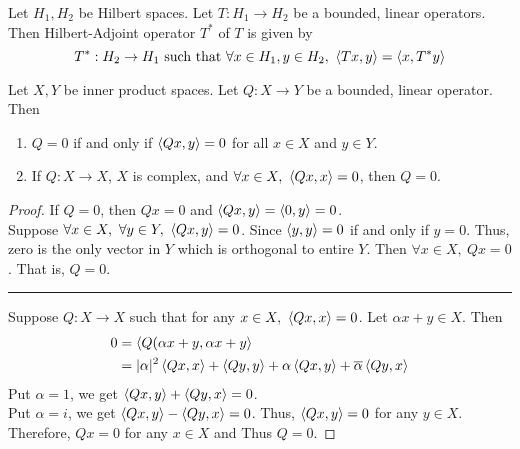 \begin{definition}
	Let $H_1,H_2$ be Hilbert spaces.
	Let $T : H_1 \to H_2$ be a bounded, linear operators.
	Then Hilbert-Adjoint operator $T^\ast$ of $T$ is given by
	\[ T^\ast : H_2 \to H_1 \text{ such that } \forall x \in H_1,y \in H_2,\  \left\langle Tx,y \right\rangle = \left\langle x,T^\ast y \right\rangle \]
\end{definition}

\begin{lemma}
	Let $X,Y$ be inner product spaces.
	Let $Q : X \to Y$ be a bounded, linear operator.
	Then
	\begin{enumerate}
		\item $Q = 0$ if and only if $\left\langle Qx,y \right\rangle = 0$ for all $x \in X$ and $y \in Y$.
		\item If $Q : X \to X$, $X$ is complex, and $\forall x \in X,\ \inner{Qx}{x}= 0$, then $Q = 0$.
	\end{enumerate}
\end{lemma}
\begin{proof}
	If $Q = 0$, then $Qx = 0$ and $\left\langle Qx,y \right\rangle = \left\langle 0,y \right\rangle = 0$.\\

	Suppose $\forall x \in X,\ \forall y \in Y,\ \inner{Qx}{y} = 0$.
	Since $\left\langle y,y \right\rangle = 0$ if and only if $y = 0$.
	Thus, zero is the only vector in $Y$ which is orthogonal to entire $Y$.
	Then $\forall x \in X,\ Qx = 0$.
	That is, $Q = 0$.\\

	\hrule \vspace{1em}

	Suppose $Q : X \to X$ such that for any $x \in X,\ \left\langle Qx,x \right\rangle = 0$.
	Let $\alpha x + y \in X$.
	Then
	\begin{align*}
		0 & = \left\langle Q(\alpha x + y,\alpha x + y \right\rangle\\
		& = |\alpha|^2 \left\langle Qx,x \right\rangle + \left\langle Qy,y \right\rangle + \alpha \left\langle Qx,y \right\rangle + \overline{\alpha}\left\langle Qy,x \right\rangle
	\end{align*}
	Put $\alpha = 1$, we get $\left\langle Qx,y \right\rangle + \left\langle Qy,x \right\rangle = 0$.\\
	Put $\alpha = i$, we get $\left\langle Qx,y \right\rangle - \left\langle Qy,x \right\rangle = 0$.
	Thus, $\left\langle Qx,y \right\rangle = 0$ for any $y \in X$.
	Therefore, $Qx = 0$ for any $x \in X$ and Thus $Q = 0$.
\end{proof}

